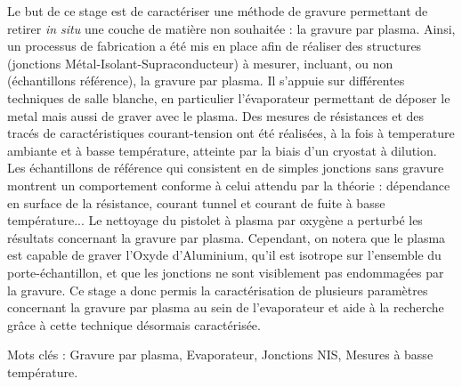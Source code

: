 Le but de ce stage est de caractériser une méthode de gravure permettant de retirer \textit{in situ} une couche de matière non souhaitée : la gravure par plasma. Ainsi, un processus de fabrication a été mis en place afin de réaliser des structures (jonctions Métal-Isolant-Supraconducteur) à mesurer, incluant, ou non (échantillons référence), la gravure par plasma. Il s'appuie sur différentes techniques de salle blanche, en particulier l'évaporateur permettant de déposer le metal mais aussi de graver avec le plasma. Des mesures de résistances et des tracés de caractéristiques courant-tension ont été réalisées, à la fois à temperature ambiante et à basse température, atteinte par la biais d'un cryostat à dilution. Les échantillons de référence qui consistent en de simples jonctions sans gravure montrent un comportement conforme à celui attendu par la théorie : dépendance en surface de la résistance, courant tunnel et courant de fuite à basse température... Le nettoyage du pistolet à plasma par oxygène a perturbé les résultats concernant la gravure par plasma. Cependant, on notera que le plasma est capable de graver l'Oxyde d'Aluminium, qu'il est isotrope sur l'ensemble du porte-échantillon, et que les jonctions ne sont visiblement pas endommagées par la gravure. Ce stage a donc permis la caractérisation de plusieurs paramètres concernant la gravure par plasma au sein de l'evaporateur et aide à la recherche grâce à cette technique désormais caractérisée.

Mots clés : Gravure par plasma, Evaporateur, Jonctions NIS, Mesures à basse température.
